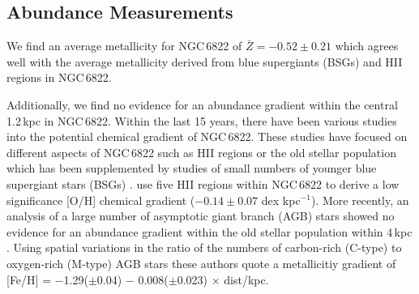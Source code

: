 \documentclass[manuscript]{aastex}
\def\2{\footnotesize II\normalsize}
\begin{document}


\subsection{Abundance Measurements} %
\label{sub:abundance_measurements}

We find an average metallicity for NGC\,6822 of $\bar{Z} = -0.52\pm 0.21$
which agrees well with the average metallicity derived from blue supergiants (BSGs)
\citep{2001ApJ...547..765V,1999A&A...352L..40M} and H\2 regions
\citep{2006ApJ...642..813L} in NGC\,6822.


Additionally, we find no evidence for an abundance gradient within the central 1.2\,kpc in NGC\,6822.
Within the last 15 years,
there have been various studies into the potential chemical gradient of NGC\,6822.
These studies have focused on different aspects of NGC\,6822 such as H\2 regions
\citep{2006ApJ...647..970L} or the old stellar population
\citep{2005A&A...429..837C} which has been supplemented by studies of small numbers of younger blue supergiant stars (BSGs)
\citep{2001ApJ...547..765V,1999A&A...352L..40M}.
\cite{2006ApJ...642..813L} use five H\2 regions within NGC\,6822 to derive a low significance [O/H] chemical gradient ($-0.14\pm 0.07$ dex kpc$^{-1}$).
More recently,
an analysis of a large number of asymptotic giant branch (AGB) stars showed no evidence for an abundance gradient within the old stellar population within 4\,kpc
\citep{2012A&A...540A.135S}.
Using spatial variations in the ratio of the numbers of carbon-rich (C-type) to oxygen-rich (M-type) AGB stars
these authors quote a metallicitiy gradient of [Fe/H] = $-$1.29($\pm$0.04) $-$ 0.008($\pm$0.023) $\times$ dist/kpc.
\end{document}
